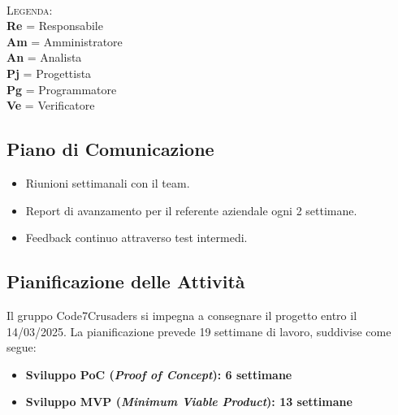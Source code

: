 \documentclass{article}
\begin{document}
        \\
        \textsc{Legenda:} \\
            \textbf{Re} = Responsabile \\
            \textbf{Am} = Amministratore \\
            \textbf{An} = Analista \\
            \textbf{Pj} = Progettista \\
            \textbf{Pg} = Programmatore \\
            \textbf{Ve} = Verificatore \\
        
            \subsection{Piano di Comunicazione}
            \begin{itemize}
                \item Riunioni settimanali con il team.
                \item Report di avanzamento per il referente aziendale ogni 2 settimane.
                \item Feedback continuo attraverso test intermedi.
            \end{itemize}
        
            \subsection{Pianificazione delle Attività}
                Il gruppo Code7Crusaders
                si impegna a consegnare il progetto entro il 14/03/2025. La pianificazione prevede
                19 settimane di lavoro, suddivise come segue:
                \begin{itemize}
                    \item \textbf{Sviluppo PoC (\textit{Proof of Concept}): 6 settimane}
                    \item \textbf{Sviluppo MVP (\textit{Minimum Viable Product}): 13 settimane}
                \end{itemize}
        
\end{document}
